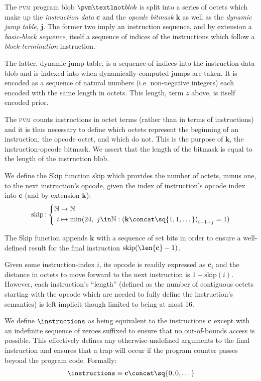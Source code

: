 The \textsc{pvm} program blob $\pvm¬blob$ is split into a series of octets which make up the \emph{instruction data} $\mathbf{c}$ and the \emph{opcode bitmask} $\mathbf{k}$ as well as the \emph{dynamic jump table}, $\mathbf{j}$. The former two imply an instruction sequence, and by extension a \emph{basic-block sequence}, itself a sequence of indices of the instructions which follow a \emph{block-termination} instruction.

The latter, dynamic jump table, is a sequence of indices into the instruction data blob and is indexed into when dynamically-computed jumps are taken. It is encoded as a sequence of natural numbers (i.e. non-negative integers) each encoded with the same length in octets. This length, term $z$ above, is itself encoded prior.

The \textsc{pvm} counts instructions in octet terms (rather than in terms of instructions) and it is thus necessary to define which octets represent the beginning of an instruction, \ie the opcode octet, and which do not. This is the purpose of $\mathbf{k}$, the instruction-opcode bitmask. We assert that the length of the bitmask is equal to the length of the instruction blob.

\newcommand{\Fskip}{\text{skip}}

We define the Skip function $\Fskip$ which provides the number of octets, minus one, to the next instruction's opcode, given the index of instruction's opcode index into $\mathbf{c}$ (and by extension $\mathbf{k}$):
\begin{equation}\label{eq:skip}
  \Fskip\colon\abracegroup{
    \N &\to \N\\
    i &\mapsto \min(24,\ j \in \N : \tup{\mathbf{k} \concat \sq{1, 1, \dots}}_{i + 1 + j} = 1)
  }
\end{equation}

The Skip function appends $\mathbf{k}$ with a sequence of set bits in order to ensure a well-defined result for the final instruction $\Fskip(\len{\mathbf{c}} - 1)$.

Given some instruction-index $i$, its opcode is readily expressed as $\mathbf{c}_i$ and the distance in octets to move forward to the next instruction is $1 + \Fskip(i)$. However, each instruction's ``length'' (defined as the number of contiguous octets starting with the opcode which are needed to fully define the instruction's semantics) is left implicit though limited to being at most 16.

We define $\instructions$ as being equivalent to the instructions $\mathbf{c}$ except with an indefinite sequence of zeroes suffixed to ensure that no out-of-bounds access is possible. This effectively defines any otherwise-undefined arguments to the final instruction and ensures that a trap will occur if the program counter passes beyond the program code. Formally:
\begin{equation}\label{eq:instructions}
  \instructions \equiv \mathbf{c} \concat \sq{0, 0, \dots}
\end{equation}

